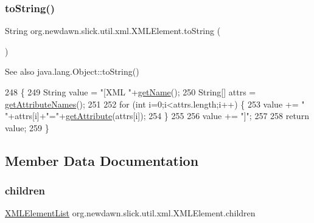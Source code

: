 \subsubsection{\texorpdfstring{to\+String()}{toString()}}
{\footnotesize\ttfamily String org.\+newdawn.\+slick.\+util.\+xml.\+X\+M\+L\+Element.\+to\+String (\begin{DoxyParamCaption}{ }\end{DoxyParamCaption})\hspace{0.3cm}{\ttfamily [inline]}}

\begin{DoxySeeAlso}{See also}
java.\+lang.\+Object\+::to\+String() 
\end{DoxySeeAlso}

\begin{DoxyCode}
248                              \{
249         String value = \textcolor{stringliteral}{"[XML "}+\mbox{\hyperlink{classorg_1_1newdawn_1_1slick_1_1util_1_1xml_1_1_x_m_l_element_aae1473c007cf9349735fd0ed60ad7b3a}{getName}}();
250         String[] attrs = \mbox{\hyperlink{classorg_1_1newdawn_1_1slick_1_1util_1_1xml_1_1_x_m_l_element_a094548131938fb0ede3ab450846251f9}{getAttributeNames}}();
251         
252         \textcolor{keywordflow}{for} (\textcolor{keywordtype}{int} i=0;i<attrs.length;i++) \{
253             value += \textcolor{stringliteral}{" "}+attrs[i]+\textcolor{stringliteral}{"="}+\mbox{\hyperlink{classorg_1_1newdawn_1_1slick_1_1util_1_1xml_1_1_x_m_l_element_a49543d209f2f2709c8e7a88fac034c69}{getAttribute}}(attrs[i]);
254         \}
255         
256         value += \textcolor{stringliteral}{"]"};
257         
258         \textcolor{keywordflow}{return} value;
259     \}
\end{DoxyCode}


\subsection{Member Data Documentation}
\mbox{\label{classorg_1_1newdawn_1_1slick_1_1util_1_1xml_1_1_x_m_l_element_a2d9787fb2a9c9cd8a01312d82ecdadce}} 
\subsubsection{\texorpdfstring{children}{children}}
{\footnotesize\ttfamily \mbox{\hyperlink{classorg_1_1newdawn_1_1slick_1_1util_1_1xml_1_1_x_m_l_element_list}{X\+M\+L\+Element\+List}} org.\+newdawn.\+slick.\+util.\+xml.\+X\+M\+L\+Element.\+children\hspace{0.3cm}{\ttfamily [private]}}

